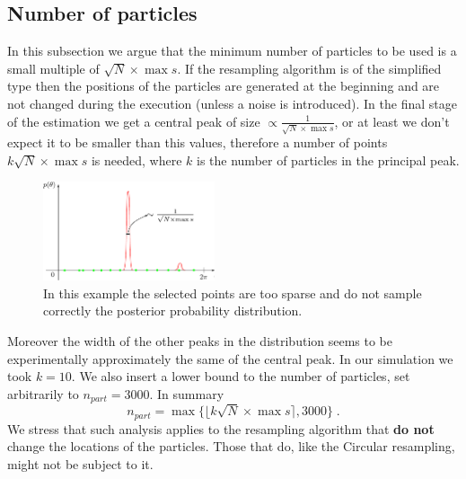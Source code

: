 \documentclass[aps, pra, 10pt, twocolumn, superscriptaddress,floatfix]{revtex4-1}
\newcommand{\round}[1]{\ensuremath{\lfloor#1\rceil}}
\begin{document}
\subsection{Number of particles}
\label{sec:numPart}
%
In this subsection we argue that the minimum number of particles to be used is a small multiple of $\sqrt{N} \times \max{s}$. If the resampling algorithm is of the simplified type then the positions of the particles are generated at the beginning and are not changed during the execution (unless a noise is introduced). In the final stage of the estimation we get a central peak of size $\propto \frac{1}{\sqrt{N} \times \max{s}}$, or at least we don't expect it to be smaller than this values, therefore a number of points $k\sqrt{N} \times \max{s}$ is needed, where $k$ is the number of particles in the principal peak.
%
\begin{figure}[!t]
	\begin{center}
		\includegraphics[width=0.45\textwidth]{immagini/numParticles.pdf}
	\end{center}
	\caption{In this example the selected points are too sparse and do not sample correctly the posterior probability distribution.}
	\label{fig:typicalPeak}
\end{figure}
%
Moreover the width of the other peaks in the distribution seems to be experimentally approximately the same of the central peak. In our simulation we took $k =10$. We also insert a lower bound to the number of particles, set arbitrarily to $n_{part} = 3000$. In summary 
%
\begin{equation}
	n_{part} = \max \lbrace \round{k \sqrt{N} \times \max{s}} , 3000 \rbrace \; .
\end{equation}
%
We stress that such analysis applies to the resampling algorithm that \textbf{do not} change the locations of the particles. Those that do, like the Circular resampling, might not be subject to it.
\end{document}
